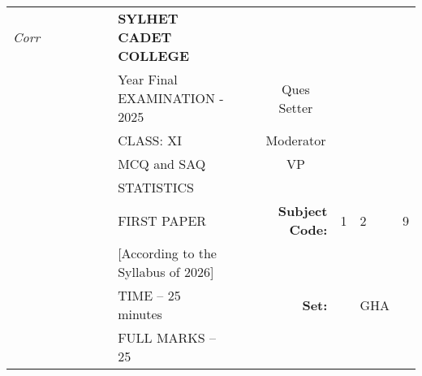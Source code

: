 \documentclass[12pt]{exam}
\begin{document}
\begin{table}[]
\begin{tabular}{lllllllllrlll}
\textit{Corr} &  &  &  &  &  & \textbf{SYLHET CADET COLLEGE}       &  &                       & \multicolumn{1}{l}{}                        &                        &                        &                        \\ \cline{10-13} 
       &  &  &  &  &  & Year Final EXAMINATION - 2025             &  & \multicolumn{1}{l|}{} & \multicolumn{1}{c|}{Ques Setter}            & \multicolumn{3}{l|}{}                                                    \\ \cline{10-13} 
       &  &  &  &  &  & CLASS: XI                          &  & \multicolumn{1}{l|}{} & \multicolumn{1}{c|}{Moderator}              & \multicolumn{3}{l|}{}                                                    \\ \cline{10-13} 
       &  &  &  &  &  & MCQ and SAQ           &  & \multicolumn{1}{l|}{} & \multicolumn{1}{c|}{VP}                     & \multicolumn{3}{l|}{}                                                    \\ \cline{10-13} 
       &  &  &  &  &  & STATISTICS                          &  &                       &                                             &                        &                        &                        \\ \cline{11-13} 
       &  &  &  &  &  & FIRST PAPER                        &  &                       & \multicolumn{1}{r|}{\textbf{Subject Code:}} & \multicolumn{1}{l|}{1} & \multicolumn{1}{l|}{2} & \multicolumn{1}{l|}{9} \\ \cline{11-13} 
       &  &  &  &  &  & [According to the Syllabus of 2026] &  &                       &                                             &                        &                        &                        \\ \cline{12-12}
       &  &  &  &  &  & TIME – 25 minutes                   &  &                       & \textbf{Set:}                               & \multicolumn{1}{l|}{}  & \multicolumn{1}{l|}{GHA} &                        \\ \cline{12-12}
       &  &  &  &  &  & FULL MARKS – 25                     &  &                       & \multicolumn{1}{l}{}                        &                        &                        &                       
\end{tabular}
\end{table}
\end{document}
